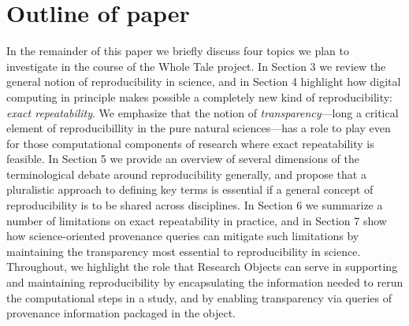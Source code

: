 \section{Outline of paper}
In the remainder of this paper we briefly discuss four topics we plan to investigate
	in the course of the Whole Tale project.
In Section 3 we review the general notion of reproducibility in science, and in Section 4
	highlight how digital computing in principle makes possible a completely new kind of reproducibility: 
	\emph{exact repeatability}. 
We emphasize that the notion of \emph{transparency}---long a critical element of
	reproducibillity in the pure natural sciences---has a role to play even for those computational components
	of research where exact repeatability is feasible.
In Section 5 we provide an overview of several dimensions of the terminological debate around reproducibility
	generally, and propose that a pluralistic approach to defining key terms is essential if a general 
	concept of reproducibility is to be shared across disciplines.
In Section 6 we summarize a number of limitations on exact repeatability in practice, and in Section 7 
	show how science-oriented provenance queries can mitigate such limitations by maintaining
 	the transparency most essential to reproducibility in science.
Throughout, we highlight the role that Research Objects can serve in supporting and maintaining 
	reproducibility by encapsulating the information needed to rerun the computational steps
	in a study, and by enabling transparency via queries of provenance information
	packaged in the object. 
 